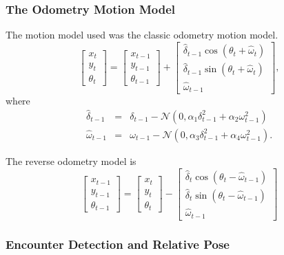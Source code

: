 \subsubsection{The Odometry Motion Model}

The motion model used was the classic odometry motion model.  
\begin{equation}
\begin{bmatrix}
x_{t}\\
y_{t}\\
\theta_{t}
\end{bmatrix}=\begin{bmatrix}
x_{t-1}\\
y_{t-1}\\
\theta_{t-1}
\end{bmatrix}+\begin{bmatrix}
\hat{\delta}_{t-1}  \cos(\theta_t+\hat{\omega}_t)\\
\hat{\delta}_{t-1}\sin(\theta_t+\hat{\omega}_t)\\
\hat{\omega}_{t-1}
\end{bmatrix},
\label{eq:OdometryMotion}
\end{equation}
where
\begin{eqnarray}
\hat{\delta}_{t-1}&=&\delta_{t-1}-\mathcal{N}(0,\alpha_1\delta_{t-1}^2+\alpha_2\omega_{t-1}^2)\\
\hat{\omega}_{t-1}&=&\omega_{t-1}-\mathcal{N}(0,\alpha_3\delta_{t-1}^2+\alpha_4\omega_{t-1}^2).
\end{eqnarray}

The reverse odometry model is
\begin{equation}
\begin{bmatrix}
x_{t-1}\\
y_{t-1}\\
\theta_{t-1}
\end{bmatrix}=\begin{bmatrix}
x_{t}\\
y_{t}\\
\theta_{t}
\end{bmatrix}-\begin{bmatrix}
\hat{\delta}_t  \cos(\theta_t-\hat{\omega}_{t-1})\\
\hat{\delta}_{t}\sin(\theta_t-\hat{\omega}_{t-1})\\
\hat{\omega}_{t-1}
\end{bmatrix}
\label{eq:ReverseOdometryMotion}
\end{equation}

\subsubsection{Encounter Detection and Relative Pose}

